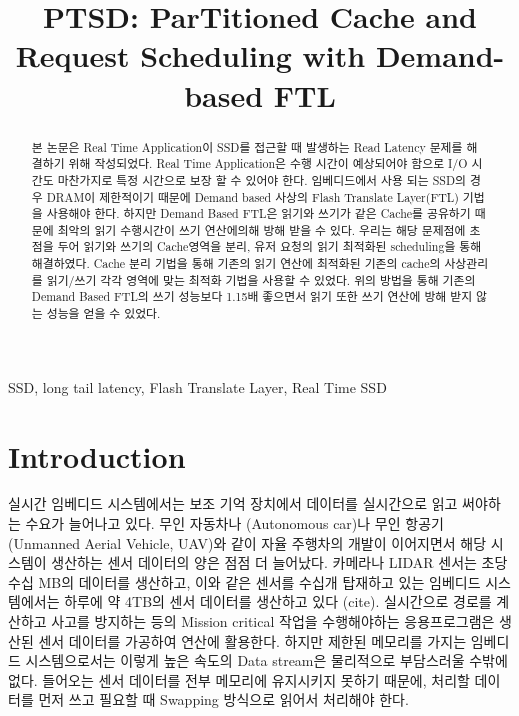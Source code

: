 \documentclass[conference]{IEEEtran}
\begin{document}
\title{PTSD: \textbf{P}ar\textbf{T}itioned Cache and Request \textbf{S}cheduling with \textbf{D}emand-based FTL}

\author{
\and
{}
}

\maketitle

\begin{abstract}
본 논문은 Real Time Application이 SSD를 접근할 때 발생하는 Read Latency 문제를 해결하기 위해 작성되었다.
Real Time Application은 수행 시간이 예상되어야 함으로 I/O 시간도 마찬가지로 특정 시간으로 보장 할 수 있어야 한다.
임베디드에서 사용 되는 SSD의 경우 DRAM이 제한적이기 때문에 Demand based 사상의 Flash Translate Layer(FTL) 기법을 사용해야 한다.
하지만 Demand Based FTL은 읽기와 쓰기가 같은 Cache를 공유하기 때문에  최악의 읽기 수행시간이 쓰기 연산에의해 방해 받을 수 있다.
우리는 해당 문제점에 초점을 두어 읽기와 쓰기의 Cache영역을 분리, 유저 요청의 읽기 최적화된 scheduling을 통해 해결하였다.
Cache 분리 기법을 통해 기존의 읽기 연산에 최적화된 기존의 cache의 사상관리를 읽기/쓰기 각각 영역에 맞는 최적화 기법을 사용할 수 있었다.
 위의 방법을 통해 기존의 Demand Based FTL의 쓰기 성능보다 1.15배 좋으면서 읽기 또한 쓰기 연산에 방해 받지 않는 성능을 얻을 수 있었다.
\end{abstract}

\begin{IEEEkeywords}
SSD, long tail latency, Flash Translate Layer, Real Time SSD
\end{IEEEkeywords}

\section{Introduction}

실시간 임베디드 시스템에서는 보조 기억 장치에서 데이터를 실시간으로 읽고 써야하는 수요가 늘어나고 있다.
무인 자동차나 (Autonomous car)나 무인 항공기 (Unmanned Aerial Vehicle, UAV)와 같이 자율 주행차의 개발이 이어지면서
해당 시스템이 생산하는 센서 데이터의 양은 점점 더 늘어났다. 카메라나 LIDAR 센서는 초당 수십 MB의 데이터를 생산하고,
이와 같은 센서를 수십개 탑재하고 있는 임베디드 시스템에서는 하루에 약 4TB의 센서 데이터를 생산하고 있다 (cite).
실시간으로 경로를 계산하고 사고를 방지하는 등의 Mission critical 작업을 수행해야하는 응용프로그램은
생산된 센서 데이터를 가공하여 연산에 활용한다. 하지만 제한된 메모리를 가지는 임베디드 시스템으로서는 이렇게 높은 속도의
Data stream은 물리적으로 부담스러울 수밖에 없다. 들어오는 센서 데이터를 전부 메모리에 유지시키지 못하기 때문에,
처리할 데이터를 먼저 쓰고 필요할 때 Swapping 방식으로 읽어서 처리해야 한다. \par
\end{document}
